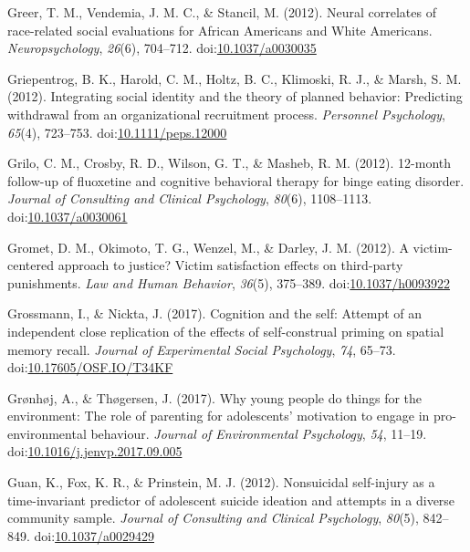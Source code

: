 \documentclass[english,man]{apa6}
\theoremstyle{definition}
\theoremstyle{definition}
\theoremstyle{definition}
\theoremstyle{remark}
\begin{document}
\hypertarget{ref-Greer2012}{}
Greer, T. M., Vendemia, J. M. C., \& Stancil, M. (2012). Neural
correlates of race-related social evaluations for African Americans and
White Americans. \emph{Neuropsychology}, \emph{26}(6), 704--712.
doi:\href{https://doi.org/10.1037/a0030035}{10.1037/a0030035}

\hypertarget{ref-Griepentrog2012}{}
Griepentrog, B. K., Harold, C. M., Holtz, B. C., Klimoski, R. J., \&
Marsh, S. M. (2012). Integrating social identity and the theory of
planned behavior: Predicting withdrawal from an organizational
recruitment process. \emph{Personnel Psychology}, \emph{65}(4),
723--753.
doi:\href{https://doi.org/10.1111/peps.12000}{10.1111/peps.12000}

\hypertarget{ref-Grilo2012}{}
Grilo, C. M., Crosby, R. D., Wilson, G. T., \& Masheb, R. M. (2012).
12-month follow-up of fluoxetine and cognitive behavioral therapy for
binge eating disorder. \emph{Journal of Consulting and Clinical
Psychology}, \emph{80}(6), 1108--1113.
doi:\href{https://doi.org/10.1037/a0030061}{10.1037/a0030061}

\hypertarget{ref-Gromet2012}{}
Gromet, D. M., Okimoto, T. G., Wenzel, M., \& Darley, J. M. (2012). A
victim-centered approach to justice? Victim satisfaction effects on
third-party punishments. \emph{Law and Human Behavior}, \emph{36}(5),
375--389. doi:\href{https://doi.org/10.1037/h0093922}{10.1037/h0093922}

\hypertarget{ref-Grossmann2017}{}
Grossmann, I., \& Nickta, J. (2017). Cognition and the self: Attempt of
an independent close replication of the effects of self-construal
priming on spatial memory recall. \emph{Journal of Experimental Social
Psychology}, \emph{74}, 65--73.
doi:\href{https://doi.org/10.17605/OSF.IO/T34KF}{10.17605/OSF.IO/T34KF}

\hypertarget{ref-Gruxf8nhuxf8j2017}{}
Grønhøj, A., \& Thøgersen, J. (2017). Why young people do things for the
environment: The role of parenting for adolescents' motivation to engage
in pro-environmental behaviour. \emph{Journal of Environmental
Psychology}, \emph{54}, 11--19.
doi:\href{https://doi.org/10.1016/j.jenvp.2017.09.005}{10.1016/j.jenvp.2017.09.005}

\hypertarget{ref-Guan2012}{}
Guan, K., Fox, K. R., \& Prinstein, M. J. (2012). Nonsuicidal
self-injury as a time-invariant predictor of adolescent suicide ideation
and attempts in a diverse community sample. \emph{Journal of Consulting
and Clinical Psychology}, \emph{80}(5), 842--849.
doi:\href{https://doi.org/10.1037/a0029429}{10.1037/a0029429}
\end{document}
